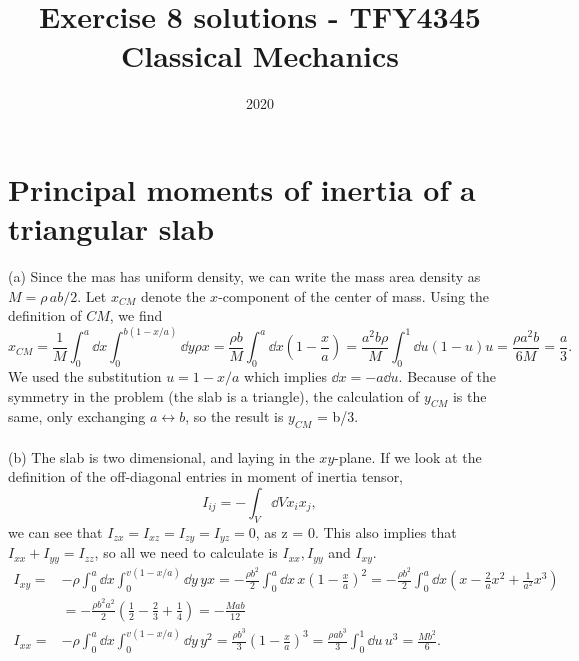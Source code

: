 \documentclass{article}
\title{Exercise 8 solutions - TFY4345 Classical Mechanics}
\date{2020}
\begin{document}
    \maketitle
    \section{Principal moments of inertia of a triangular slab}
        (a) Since the mas has uniform density, we can write the mass area density as $M =   \rho \, ab/2$. Let $x_{CM}$ denote the $x$-component of the center of mass. Using the definition of $CM$, we find
        \begin{equation*}
            x_{CM} = \frac{1}{M} \int_0^a \dd x \int_0^{b(1 - x / a)} \dd y \rho x = \frac{\rho b}{M} \int_0^a \dd x \left( 1 - \frac{x}{a}\right) = \frac{a^2 b \rho}{M} \int_0^1 \dd u (1 - u)u = \frac{\rho a^2 b}{6M} = \frac{a}{3}. 
        \end{equation*}
        We used the substitution $u = 1 - x/a$ which implies $ \dd x = - a \dd u $. Because of the symmetry in the problem (the slab is a triangle), the calculation of $y_{CM}$ is the same, only exchanging $ a \leftrightarrow b $, so the result is $y_{CM}$ = b/3. 
        \\ \\
        (b) The slab is two dimensional, and laying in the $xy$-plane. If we look at the definition of the off-diagonal entries in moment of inertia tensor,
        \begin{equation*}
            I_{ij} = - \int_V \dd V x_ix_j,
        \end{equation*} 
        we can see that $I_{zx} = I_{xz} = I_{zy} = I_{yz} = 0$, as  z = 0. This also implies that $I_{xx} + I_{yy} = I_{zz}$, so all we need to calculate is $I_{xx}, I_{yy}$ and $I_{xy}$.
        \begin{align*}
            I_{xy} =& -\rho \int_0^a \dd x \int_0^{v(1 - x/a)} \dd y \, yx 
            = - \frac{\rho b^2}{2}\int_0^a \dd x\, x \left( 1 - \frac{x}{a} \right)^2 
            = - \frac{\rho b^2}{2} \int_0^a \dd x \left( x - \frac{2}{a}x^2 + \frac{1}{a^2} x^3\right) \\
            &= -\frac{\rho b^2 a^2}{2}\left( \frac{1}{2} - \frac{2}{3} + \frac{1}{4} \right) = -\frac{M a b}{12} \\
            I_{xx} = & -\rho \int_0^a \dd x \int_0^{v(1 - x/a)} \dd y \,y^2 
            = \frac{\rho b^3}{3} \left(1 - \frac{x}{a}\right)^3 = \frac{\rho a b^3}{3} \int_0^1 \dd u \,u^3 = \frac{M b^2}{6}.
        \end{align*} 
\end{document}
